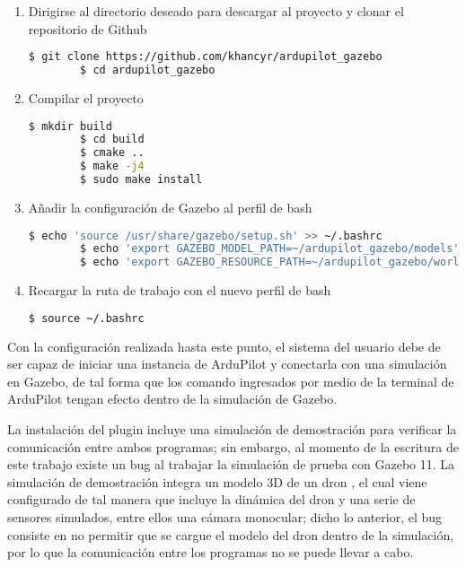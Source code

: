\begin{enumerate}
    \item Dirigirse al directorio deseado para descargar al proyecto y clonar el repositorio de Github

    \begin{lstlisting}[language = bash]
        $ git clone https://github.com/khancyr/ardupilot_gazebo
        $ cd ardupilot_gazebo
    \end{lstlisting}  

    \item Compilar el proyecto

    \begin{lstlisting}[language = bash]
        $ mkdir build
        $ cd build
        $ cmake ..
        $ make -j4
        $ sudo make install
    \end{lstlisting} 

    \item Añadir la configuración de Gazebo al perfil de bash

    \begin{lstlisting}[language = bash]
        $ echo 'source /usr/share/gazebo/setup.sh' >> ~/.bashrc
        $ echo 'export GAZEBO_MODEL_PATH=~/ardupilot_gazebo/models' >> ~/.bashrc
        $ echo 'export GAZEBO_RESOURCE_PATH=~/ardupilot_gazebo/worlds:${GAZEBO_RESOURCE_PATH}' >> ~/.bashrc
    \end{lstlisting} 

    \item Recargar la ruta de trabajo con el nuevo perfil de bash
    
    \begin{lstlisting}[language = bash]
        $ source ~/.bashrc
    \end{lstlisting} 

\end{enumerate}

Con la configuración realizada hasta este punto, el sistema del usuario debe de ser capaz de iniciar una instancia de ArduPilot y conectarla con una simulación en Gazebo, de tal forma que los comando ingresados por medio de la terminal de ArduPilot tengan efecto dentro de la simulación de Gazebo. 

La instalación del plugin incluye una simulación de demostración para verificar la comunicación entre ambos programas; sin embargo, al momento de la escritura de este trabajo existe un bug al trabajar la simulación de prueba con Gazebo 11. 
La simulación de demostración integra un modelo 3D de un dron , el cual viene configurado de tal manera que incluye la dinámica del dron y una serie de sensores simulados, entre ellos una cámara monocular; dicho lo anterior, el bug consiste en no permitir que se cargue el modelo del dron dentro de la simulación, por lo que la comunicación entre los programas no se puede llevar a cabo.


